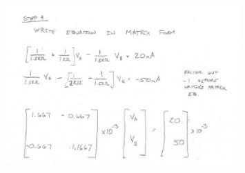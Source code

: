 \documentclass{handout}
\begin{document}
{\begin{figure} [h t b]
\centering
\includegraphics[width=0.8\textwidth]{NodalAnalysisEx1solnC.jpg}
\end{figure}
}

\newpage
\pagebreak
\clearpage
\end{document}
